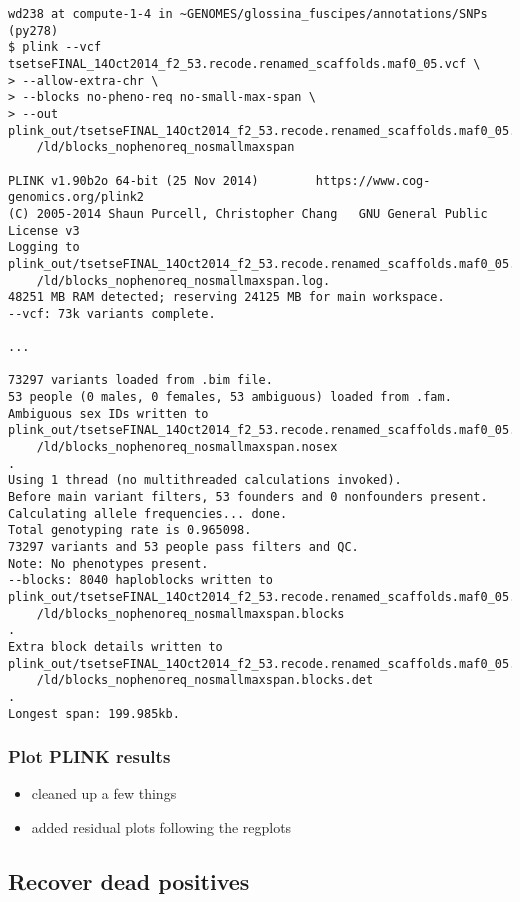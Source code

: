 \documentclass[letterpaper]{scrartcl}
\begin{document}
\begin{verbatim}
wd238 at compute-1-4 in ~GENOMES/glossina_fuscipes/annotations/SNPs (py278) 
$ plink --vcf tsetseFINAL_14Oct2014_f2_53.recode.renamed_scaffolds.maf0_05.vcf \
> --allow-extra-chr \
> --blocks no-pheno-req no-small-max-span \
> --out plink_out/tsetseFINAL_14Oct2014_f2_53.recode.renamed_scaffolds.maf0_05.vcf\
    /ld/blocks_nophenoreq_nosmallmaxspan

PLINK v1.90b2o 64-bit (25 Nov 2014)        https://www.cog-genomics.org/plink2
(C) 2005-2014 Shaun Purcell, Christopher Chang   GNU General Public License v3
Logging to plink_out/tsetseFINAL_14Oct2014_f2_53.recode.renamed_scaffolds.maf0_05.vcf\
    /ld/blocks_nophenoreq_nosmallmaxspan.log.
48251 MB RAM detected; reserving 24125 MB for main workspace.
--vcf: 73k variants complete.

...

73297 variants loaded from .bim file.
53 people (0 males, 0 females, 53 ambiguous) loaded from .fam.
Ambiguous sex IDs written to
plink_out/tsetseFINAL_14Oct2014_f2_53.recode.renamed_scaffolds.maf0_05.vcf\ 
    /ld/blocks_nophenoreq_nosmallmaxspan.nosex
.
Using 1 thread (no multithreaded calculations invoked).
Before main variant filters, 53 founders and 0 nonfounders present.
Calculating allele frequencies... done.
Total genotyping rate is 0.965098.
73297 variants and 53 people pass filters and QC.
Note: No phenotypes present.
--blocks: 8040 haploblocks written to
plink_out/tsetseFINAL_14Oct2014_f2_53.recode.renamed_scaffolds.maf0_05.vcf\
    /ld/blocks_nophenoreq_nosmallmaxspan.blocks
.
Extra block details written to
plink_out/tsetseFINAL_14Oct2014_f2_53.recode.renamed_scaffolds.maf0_05.vcf\
    /ld/blocks_nophenoreq_nosmallmaxspan.blocks.det
.
Longest span: 199.985kb.
\end{verbatim}

\subsubsection{Plot PLINK results}\label{plot-plink-results-3}

\begin{itemize}
\itemsep1pt\parskip0pt\parsep0pt
\item
  cleaned up a few things
\item
  added residual plots following the regplots
\end{itemize}

\subsection{Recover dead positives}\label{recover-dead-positives-1}
\end{document}
